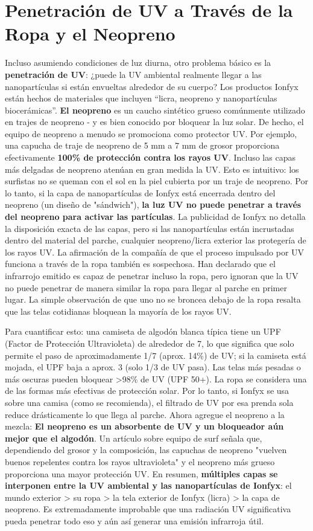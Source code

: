 \documentclass{article}
\begin{document}
\section{Penetración de UV a Través de la Ropa y el Neopreno}

Incluso asumiendo condiciones de luz diurna, otro problema básico es la \textbf{penetración de UV}: ¿puede la UV ambiental realmente llegar a las nanopartículas si están envueltas alrededor de su cuerpo? Los productos Ionfyx están hechos de materiales que incluyen “licra, neopreno y nanopartículas biocerámicas”. \textbf{El neopreno} es un caucho sintético grueso comúnmente utilizado en trajes de neopreno - y es bien conocido por bloquear la luz solar. De hecho, el equipo de neopreno a menudo se promociona como protector UV. Por ejemplo, una capucha de traje de neopreno de 5 mm a 7 mm de grosor proporciona efectivamente \textbf{100\% de protección contra los rayos UV}. Incluso las capas más delgadas de neopreno atenúan en gran medida la UV. Esto es intuitivo: los surfistas no se queman con el sol en la piel cubierta por un traje de neopreno. Por lo tanto, si la capa de nanopartículas de Ionfyx está encerrada dentro del neopreno (un diseño de "sándwich"), \textbf{la luz UV no puede penetrar a través del neopreno para activar las partículas}. La publicidad de Ionfyx no detalla la disposición exacta de las capas, pero si las nanopartículas están incrustadas dentro del material del parche, cualquier neopreno/licra exterior las protegería de los rayos UV. La afirmación de la compañía de que el proceso impulsado por UV funciona a través de la ropa también es sospechosa. Han declarado que el infrarrojo emitido es capaz de penetrar incluso la ropa, pero ignoran que la UV no puede penetrar de manera similar la ropa para llegar al parche en primer lugar. La simple observación de que uno no se broncea debajo de la ropa resalta que las telas cotidianas bloquean la mayoría de los rayos UV.

Para cuantificar esto: una camiseta de algodón blanca típica tiene un UPF (Factor de Protección Ultravioleta) de alrededor de 7, lo que significa que solo permite el paso de aproximadamente 1/7 (aprox. 14\%) de UV; si la camiseta está mojada, el UPF baja a aprox. 3 (solo 1/3 de UV pasa). Las telas más pesadas o más oscuras pueden bloquear >98\% de UV (UPF 50+). La ropa se considera una de las formas más efectivas de protección solar. Por lo tanto, si Ionfyx se usa sobre una camisa (como se recomienda), el filtrado de UV por esa prenda sola reduce drásticamente lo que llega al parche. Ahora agregue el neopreno a la mezcla: \textbf{El neopreno es un absorbente de UV y un bloqueador aún mejor que el algodón}. Un artículo sobre equipo de surf señala que, dependiendo del grosor y la composición, las capuchas de neopreno "vuelven buenos repelentes contra los rayos ultravioleta" y el neopreno más grueso proporciona una mayor protección UV. En resumen, \textbf{múltiples capas se interponen entre la UV ambiental y las nanopartículas de Ionfyx}: el mundo exterior > su ropa > la tela exterior de Ionfyx (licra) > la capa de neopreno. Es extremadamente improbable que una radiación UV significativa pueda penetrar todo eso y aún así generar una emisión infrarroja útil.
\end{document}
